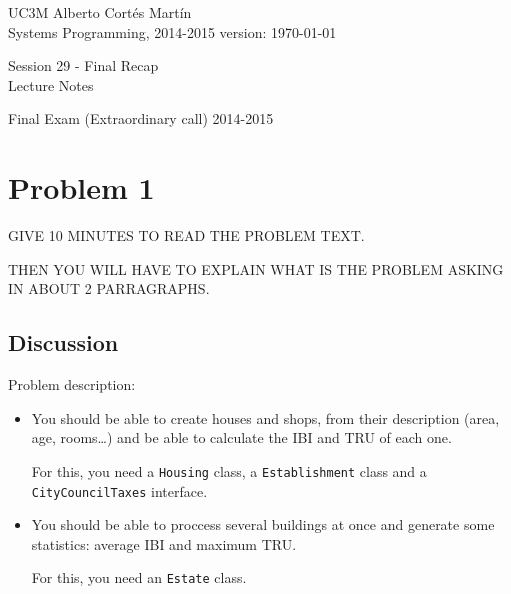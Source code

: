 \documentclass[a4paper, 9pt]{extarticle}
\newcommand{\realtitle}{Session 29 - Final Recap}
\begin{document}
\makebox[\linewidth]{\rule{\textwidth}{0.4pt}}
UC3M \hfill Alberto Cortés Martín\\
Systems Programming, 2014-2015 \hfill version: \today\\
\makebox[\linewidth]{\rule{\textwidth}{0.4pt}}
\begin{center}
  \Large{\realtitle}\\Lecture Notes
\end{center}
\makebox[\linewidth]{\rule{\textwidth}{0.4pt}}
\vspace{1cm}

\begin{center}
  {\Huge Final Exam (Extraordinary call) 2014-2015}
\end{center}

\section{Problem 1}

GIVE 10 MINUTES TO READ THE PROBLEM TEXT.

THEN YOU WILL HAVE TO EXPLAIN WHAT IS THE PROBLEM ASKING IN ABOUT 2
PARRAGRAPHS.


\subsection{Discussion}

Problem description:
\begin{multicols}{2}
\begin{itemize}
  \item You should be able to create houses and shops, from their description
    (area, age, rooms\ldots) and be able to calculate the IBI and TRU of each
    one.

    For this, you need a \texttt{Housing} class, a \texttt{Establishment} class
    and a \texttt{CityCouncilTaxes} interface.
\end{itemize}

\columnbreak

\begin{itemize}
  \item You should be able to proccess several buildings at once and generate
    some statistics: average IBI and maximum TRU.

    For this, you need an \texttt{Estate} class.

\end{itemize}
\end{multicols}
\end{document}
